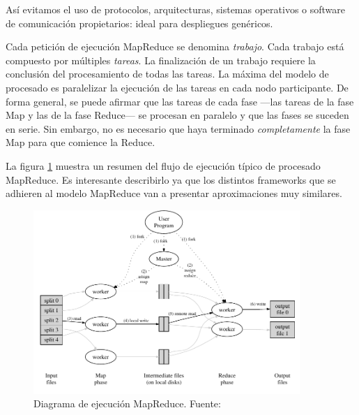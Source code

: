 As\'i evitamos el uso de protocolos, arquitecturas, sistemas operativos o software de comunicaci\'on propietarios: ideal para despliegues gen\'ericos.\newline

Cada petici\'on de ejecuci\'on MapReduce se denomina \emph{trabajo}. Cada trabajo est\'a compuesto por m\'ultiples \emph{tareas}. La finalizaci\'on de un trabajo requiere la conclusi\'on del procesamiento de todas las tareas. La m\'axima del modelo de procesado es paralelizar la ejecuci\'on de las tareas en cada nodo participante. De forma general, se puede afirmar que las tareas de cada fase ---las tareas de la fase Map y las de la fase Reduce--- se procesan en paralelo y que las fases se suceden en serie. Sin embargo, no es necesario que haya terminado \emph{completamente} la fase Map para que comience la Reduce.\newline

La figura \ref{fig:exmapreduce} muestra un resumen del flujo de ejecuci\'on t\'ipico de procesado MapReduce. Es interesante describirlo ya que los distintos frameworks que se adhieren al modelo MapReduce van a presentar aproximaciones muy similares.

\begin{figure}[tbp]
\begin{center}
 \includegraphics[width=0.9\textwidth]{imagenes/006.pdf}
 \caption{Diagrama de ejecuci\'on MapReduce. Fuente: \cite{googlemapreduce}}
 \label{fig:exmapreduce}
\end{center}
\end{figure}


